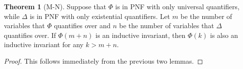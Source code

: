 \documentclass[12pt]{article}
\theoremstyle{definition}
\newtheorem{theorem}{Theorem}
\theoremstyle{remark}
\begin{document}
\begin{theorem}[M-N]
  Suppose that $\Phi$ is in PNF with only universal quantifiers, while $\Delta$ is in PNF with only existential quantifiers.  Let $m$ be the number of variables that $\Phi$ quantifies over and $n$ be the number of variables that $\Delta$ quantifies over.  If $\Phi(m+n)$ is an inductive invariant, then $\Phi(k)$ is also an inductive invariant for any $k>m+n$.
\end{theorem}
\begin{proof}
  This follows immediately from the previous two lemmas.
\end{proof}





\end{document}
